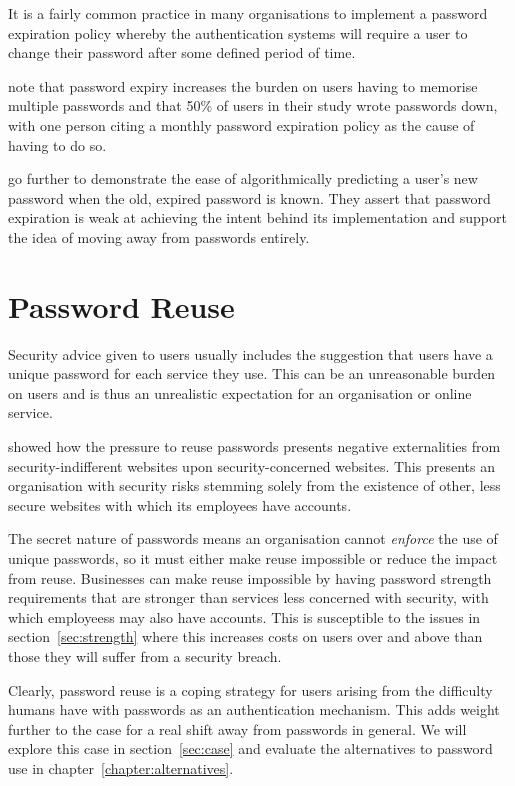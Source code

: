 \documentclass{report}
\begin{document}
It is a fairly common practice in many organisations to
implement a password expiration policy whereby the
authentication systems will require a user to change their
password after some defined period of time.

\cite{adams1999users} note that password expiry increases
the burden on users having to memorise multiple passwords and that
50\% of users in their study wrote passwords down, with one
person citing a monthly password expiration policy as the cause
of having to do so.

\cite{zhang2010security} go further to demonstrate the ease of
algorithmically predicting a user's new password when the old,
expired password is known. They assert that password expiration
is weak at achieving the intent behind its implementation and
support the idea of moving away from passwords entirely.

\section{Password Reuse}

Security advice given to users usually includes the suggestion that users
have a unique password for each service they use. This can
be an unreasonable burden on users\parencite{florencio2014password}
and is thus an unrealistic expectation for an organisation or online
service.

\cite{preibusch2010password} showed how the pressure to reuse passwords
presents negative externalities from security-indifferent websites upon
security-concerned websites. This presents an organisation with
security risks stemming solely from the existence of other, less
secure websites with which its employees have accounts.

The secret nature of passwords means an organisation cannot \emph{enforce}
the use of unique passwords, so it must either make reuse impossible or
reduce the impact from reuse. Businesses can make reuse impossible
by having password strength requirements that are stronger than
services less concerned with security, with which employeess may also have
accounts. This is susceptible to the issues in section~\ref{sec:strength}
where this increases costs on users over and above than those they will
suffer from a security breach.

Clearly, password reuse is a coping strategy for users arising from the
difficulty humans have with passwords as an authentication mechanism. This
adds weight further to the case for a real shift away from passwords in
general. We will explore this case in section~\ref{sec:case} and evaluate
the alternatives to password use in chapter~\ref{chapter:alternatives}.
\end{document}
